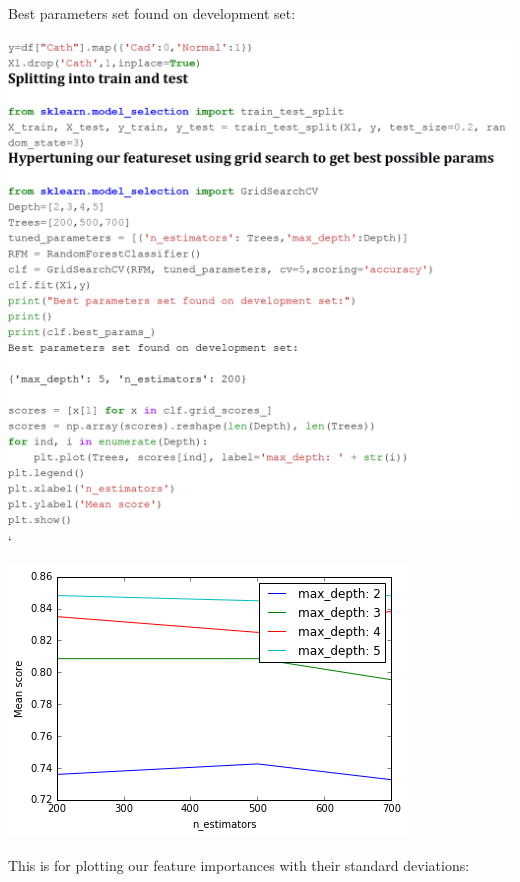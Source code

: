 \documentclass[sigconf]{acmart}
\begin{document}
Best parameters set found on development set:

\includegraphics[width=0.95\columnwidth]{images/Untitled5.png}
`

\includegraphics[width=0.95\columnwidth]{images/output_15_1.png}

This is for plotting our feature importances with their standard deviations:
\end{document}
